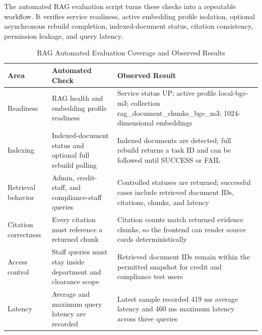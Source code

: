 The automated RAG evaluation script turns these checks into a repeatable workflow. It verifies service readiness, active embedding profile isolation, optional asynchronous rebuild completion, indexed-document status, citation consistency, permission leakage, and query latency.

\vspace{3mm}

\begin{table}[H]
\small\singlespacing
\centering
\caption{RAG Automated Evaluation Coverage and Observed Results}
\label{tab:rag-evaluation-coverage}
\vspace{2mm}

\begin{tabularx}{\textwidth}{>{\RaggedRight\arraybackslash}p{}>{\RaggedRight\arraybackslash}p{}>{\RaggedRight\arraybackslash}X}
\toprule
\textbf{Area} & \textbf{Automated Check} & \textbf{Observed Result} \\
\midrule
Readiness & RAG health and embedding profile readiness & Service status UP; active profile local-bge-m3; collection rag\_document\_chunks\_bge\_m3; 1024-dimensional embeddings \\
Indexing & Indexed-document status and optional full rebuild polling & Indexed documents are detected; full rebuild returns a task ID and can be followed until SUCCESS or FAIL \\
Retrieval behavior & Admin, credit-staff, and compliance-staff queries & Controlled statuses are returned; successful cases include retrieved document IDs, citations, chunks, and latency \\
Citation correctness & Every citation must reference a returned chunk & Citation counts match returned evidence chunks, so the frontend can render source cards deterministically \\
Access control & Staff queries must stay inside department and clearance scope & Retrieved document IDs remain within the permitted snapshot for credit and compliance test users \\
Latency & Average and maximum query latency are recorded & Latest sample recorded 419 ms average latency and 460 ms maximum latency across three queries \\
\bottomrule
\end{tabularx}
\end{table}

\newpage

